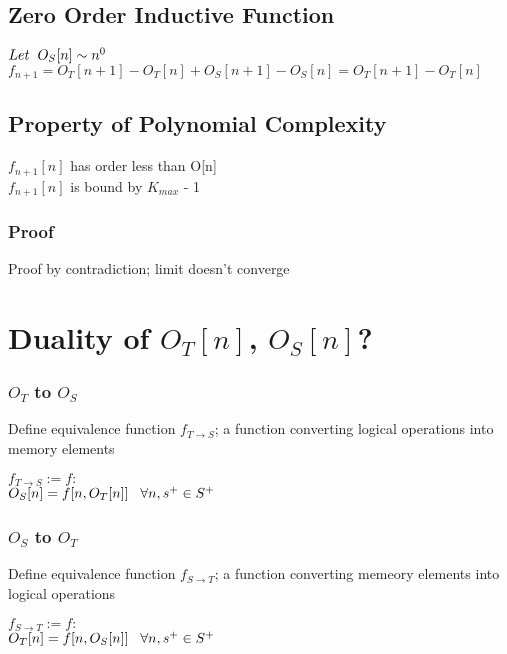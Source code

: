 \documentclass[11pt]{article}
\begin{document}
\subsection{Zero Order Inductive Function}
\begin{center}
$
Let \hspace{2mm} O_S[n] \sim n^0
$
\\ \vspace{2mm}
$
f_{n+1} = O_T[n+1] - O_T[n] + O_S[n+1] - O_S[n] = O_T[n+1] - O_T[n]
$
\end{center}


\subsection{Property of Polynomial Complexity}
$f_{n+1}[n]$ has order less than O[n]\\
$f_{n+1}[n]$ is bound by $K_{max}$ - 1
\subsubsection{Proof}
Proof by contradiction; limit doesn't converge














\newpage
\section{Duality of $O_T[n]$, $O_S[n]$?}
\subsubsection{$O_T$ to $O_S$}
Define equivalence function $f_{T \rightarrow S}$; a function converting logical operations into memory elements
\begin{center}
$
f_{T \rightarrow S} := f :
$
\\ \vspace{2mm}
$
O_S[n] = f[n,O_T[n]] \hspace{3mm} \forall n, s^+ \in S^+
$
\end{center}

\subsubsection{$O_S$ to $O_T$}
Define equivalence function $f_{S \rightarrow T}$; a function converting memeory elements into logical operations
\begin{center}
$
f_{S \rightarrow T} := f :
$
\\ \vspace{2mm}
$
O_T[n] = f[n,O_S[n]] \hspace{3mm} \forall n, s^+ \in S^+
$
\end{center}
\end{document}
